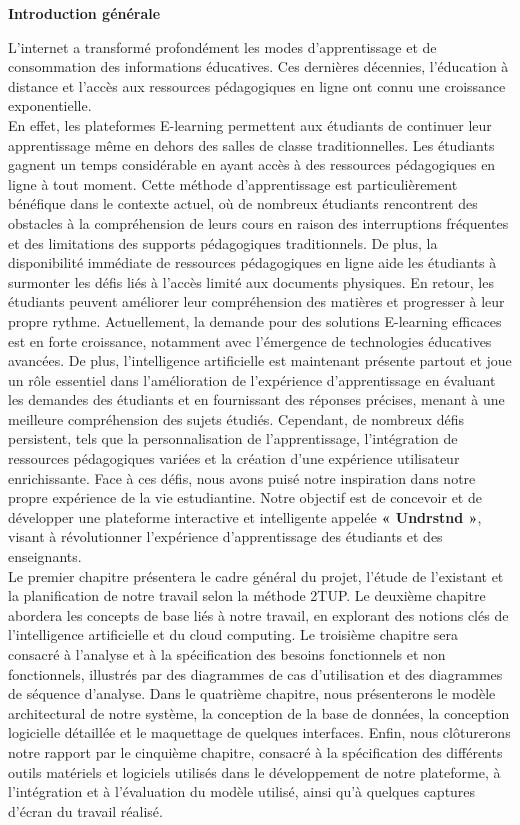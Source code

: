\thispagestyle{empty}
\begin{center}
  \textbf{\Huge Introduction générale}
\end{center}

L'internet a transformé profondément les modes d'apprentissage et de consommation des informations éducatives. Ces dernières décennies, l'éducation à distance et l'accès aux ressources pédagogiques en ligne ont connu une croissance exponentielle.\\
En effet, les plateformes E-learning permettent aux étudiants de continuer leur apprentissage même en dehors des salles de classe traditionnelles. Les étudiants gagnent un temps considérable en ayant accès à des ressources pédagogiques en ligne à tout moment. Cette méthode d'apprentissage est particulièrement bénéfique dans le contexte actuel, où de nombreux étudiants rencontrent des obstacles à la compréhension de leurs cours en raison des interruptions fréquentes et des limitations des supports pédagogiques traditionnels. De plus, la disponibilité immédiate de ressources pédagogiques en ligne aide les étudiants à surmonter les défis liés à l'accès limité aux documents physiques. En retour, les étudiants peuvent améliorer leur compréhension des matières et progresser à leur propre rythme. Actuellement, la demande pour des solutions E-learning efficaces est en forte croissance, notamment avec l'émergence de technologies éducatives avancées. De plus, l'intelligence artificielle est maintenant présente partout et joue un rôle essentiel dans l'amélioration de l'expérience d'apprentissage en évaluant les demandes des étudiants et en fournissant des réponses précises, menant à une meilleure compréhension des sujets étudiés. Cependant, de nombreux défis persistent, tels que la personnalisation de l'apprentissage, l'intégration de ressources pédagogiques variées et la création d'une expérience utilisateur enrichissante. Face à ces défis, nous avons puisé notre inspiration dans notre propre expérience de la vie estudiantine. Notre objectif est de concevoir et de développer une plateforme interactive et intelligente appelée \textbf{« Undrstnd »}, visant à révolutionner l'expérience d'apprentissage des étudiants et des enseignants.\\
Le premier chapitre présentera le cadre général du projet, l'étude de l'existant et la planification de notre travail selon la méthode 2TUP. Le deuxième chapitre abordera les concepts de base liés à notre travail, en explorant des notions clés de l'intelligence artificielle et du cloud computing. Le troisième chapitre sera consacré à l'analyse et à la spécification des besoins fonctionnels et non fonctionnels, illustrés par des diagrammes de cas d'utilisation et des diagrammes de séquence d'analyse. Dans le quatrième chapitre, nous présenterons le modèle architectural de notre système, la conception de la base de données, la conception logicielle détaillée et le maquettage de quelques interfaces. Enfin, nous clôturerons notre rapport par le cinquième chapitre, consacré à la spécification des différents outils matériels et logiciels utilisés dans le développement de notre plateforme, à l'intégration et à l'évaluation du modèle utilisé, ainsi qu'à quelques captures d'écran du travail réalisé.
